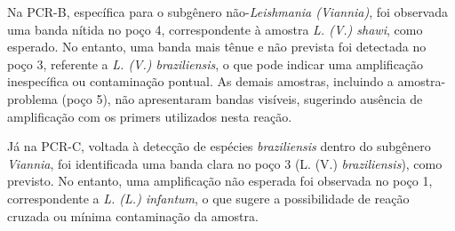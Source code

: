 Na PCR-B, específica para o subgênero não-\textit{Leishmania (Viannia)}, foi observada uma banda nítida no poço 4, correspondente à amostra \textit{L. (V.) shawi}, como esperado. 
No entanto, uma banda mais tênue e não prevista foi detectada no poço 3, referente a \textit{L. (V.) braziliensis}, o que pode indicar uma amplificação inespecífica ou contaminação 
pontual. As demais amostras, incluindo a amostra-problema (poço 5), não apresentaram bandas visíveis, sugerindo ausência de amplificação com os primers utilizados nesta reação.

Já na PCR-C, voltada à detecção de espécies \textit{braziliensis} dentro do subgênero \textit{Viannia}, foi identificada uma banda clara no poço 3 (L. (V.) \textit{braziliensis}), 
como previsto. No entanto, uma amplificação não esperada foi observada no poço 1, correspondente a \textit{L. (L.) infantum}, o que sugere a possibilidade de reação cruzada ou mínima 
contaminação da amostra.
